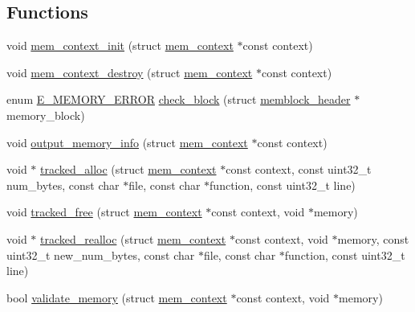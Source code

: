 \subsection*{Functions}
\begin{DoxyCompactItemize}
\item 
void \hyperlink{tracked__memory_8c_a0a67a6685295c0e8f0d891fe56353b4d}{mem\-\_\-context\-\_\-init} (struct \hyperlink{structmem__context}{mem\-\_\-context} $\ast$const context)
\item 
void \hyperlink{tracked__memory_8c_a18ea1d9235496d3eeefa9e5ef683a7a1}{mem\-\_\-context\-\_\-destroy} (struct \hyperlink{structmem__context}{mem\-\_\-context} $\ast$const context)
\item 
enum \hyperlink{tracked__memory_8h_adc7040deea27628dba424c534b71dbbf}{E\-\_\-\-M\-E\-M\-O\-R\-Y\-\_\-\-E\-R\-R\-O\-R} \hyperlink{tracked__memory_8c_ab753a667917e4aa67a8e5ee2117083ba}{check\-\_\-block} (struct \hyperlink{structmemblock__header}{memblock\-\_\-header} $\ast$memory\-\_\-block)
\item 
void \hyperlink{tracked__memory_8c_a1ed5a096e4418b4468d1f6eb94fe953a}{output\-\_\-memory\-\_\-info} (struct \hyperlink{structmem__context}{mem\-\_\-context} $\ast$const context)
\item 
void $\ast$ \hyperlink{tracked__memory_8c_a060364772083abaaf94eee077a5d3365}{tracked\-\_\-alloc} (struct \hyperlink{structmem__context}{mem\-\_\-context} $\ast$const context, const uint32\-\_\-t num\-\_\-bytes, const char $\ast$file, const char $\ast$function, const uint32\-\_\-t line)
\item 
void \hyperlink{tracked__memory_8c_adaadfc4aa30023606455c7f940868825}{tracked\-\_\-free} (struct \hyperlink{structmem__context}{mem\-\_\-context} $\ast$const context, void $\ast$memory)
\item 
void $\ast$ \hyperlink{tracked__memory_8c_a4e46491d14d0a28b73e4758cc2b20d3b}{tracked\-\_\-realloc} (struct \hyperlink{structmem__context}{mem\-\_\-context} $\ast$const context, void $\ast$memory, const uint32\-\_\-t new\-\_\-num\-\_\-bytes, const char $\ast$file, const char $\ast$function, const uint32\-\_\-t line)
\item 
bool \hyperlink{tracked__memory_8c_a1f0ff25556f5435b8c7048f58b3c80a9}{validate\-\_\-memory} (struct \hyperlink{structmem__context}{mem\-\_\-context} $\ast$const context, void $\ast$memory)
\end{DoxyCompactItemize}
